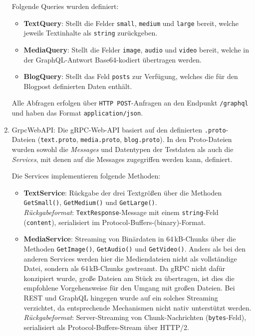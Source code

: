 \begin{enumerate}
Folgende Queries wurden definiert:
\begin{itemize}
	\item \textbf{TextQuery}: Stellt die Felder \texttt{small}, \texttt{medium} und \texttt{large} bereit, welche jeweils Textinhalte als \texttt{string} zurückgeben.
	\item \textbf{MediaQuery}: Stellt die Felder \texttt{image}, \texttt{audio} und \texttt{video} bereit, welche in der GraphQL-Antwort Base64-kodiert übertragen werden.
	\item \textbf{BlogQuery}: Stellt das Feld \texttt{posts} zur Verfügung, welches die für den Blogpost definierten Daten enthält.
\end{itemize}

Alle Abfragen erfolgen über \texttt{HTTP~POST}-Anfragen an den Endpunkt \texttt{/graphql} und haben das Format \texttt{application/json}.

\item GrpcWebAPI: 
Die gRPC-Web-API basiert auf den definierten \texttt{.proto}-Dateien (\texttt{text.proto}, \texttt{media.proto}, \texttt{blog.proto}). In den Proto-Dateien wurden sowohl die \emph{Messages} und Datentypen der Testdaten als auch die \emph{Services}, mit denen auf die Messages zugegriffen werden kann, definiert. 

Die Services implementieren folgende Methoden:
\begin{itemize}
	\item \textbf{TextService}: Rückgabe der drei Textgrößen über die Methoden \texttt{GetSmall()}, \texttt{GetMedium()} und \texttt{GetLarge()}.\\
	\emph{Rückgabeformat}: \texttt{TextResponse}-Message mit einem \texttt{string}-Feld (\texttt{content}), serialisiert im Protocol-Buffers-(binary)-Format.
	
	\item \textbf{MediaService}: Streaming von Binärdaten in 64\,kB-Chunks über die Methoden \texttt{GetImage()}, \texttt{GetAudio()} und \texttt{GetVideo()}. Anders als bei den anderen Services werden hier die Mediendateien nicht als vollständige Datei, sondern als 64\,kB-Chunks gestreamt. Da gRPC nicht dafür konzipiert wurde, große Dateien am Stück zu übertragen, ist dies die empfohlene Vorgehensweise für den Umgang mit großen Dateien. Bei REST und GraphQL hingegen wurde auf ein solches Streaming verzichtet, da entsprechende Mechanismen nicht nativ unterstützt werden.\\
	\emph{Rückgabeformat}: Server-Streaming von Chunk-Nachrichten (\texttt{bytes}-Feld), serialisiert als Protocol-Buffers-Stream über HTTP/2.
	

\end{itemize}
\end{enumerate}
